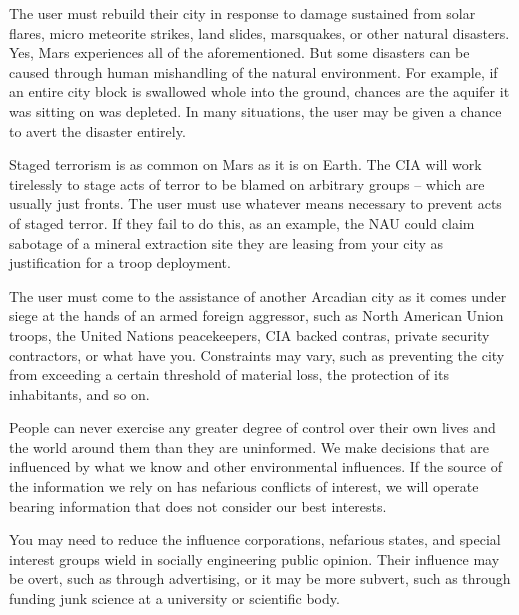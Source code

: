 The user must rebuild their city in response to damage sustained from solar flares, micro meteorite strikes, land slides, marsquakes, or other natural disasters. Yes, Mars experiences all of the aforementioned. But some  disasters can be caused through human mishandling of the natural environment. For example, if an entire city block is swallowed whole into the ground, chances are the aquifer it was sitting on was depleted. In many situations, the user may be given a chance to avert the disaster entirely.


Staged terrorism is as common on Mars as it is on Earth. The CIA will work tirelessly to stage acts of terror to be blamed on arbitrary groups -- which are usually just fronts. The user must use whatever means necessary to prevent acts of staged terror. If they fail to do this, as an example, the NAU could claim sabotage of a mineral extraction site they are leasing from your city as justification for a troop deployment.


The user must come to the assistance of another Arcadian city as it comes under siege at the hands of an armed foreign aggressor, such as North American Union troops, the United Nations peacekeepers, CIA backed contras, private security contractors, or what have you. Constraints may vary, such as preventing the city from exceeding a certain threshold of material loss, the protection of its inhabitants, and so on.


People can never exercise any greater degree of control over their own lives and the world around them than they are uninformed. We make decisions that are influenced by what we know and other environmental influences. If the source of the information we rely on has nefarious conflicts of interest, we will operate bearing information that does not consider our best interests.

You may need to reduce the influence corporations, nefarious states, and special interest groups wield in socially engineering public opinion. Their influence may be overt, such as through advertising, or it may be more subvert, such as through funding junk science at a university or scientific body.

